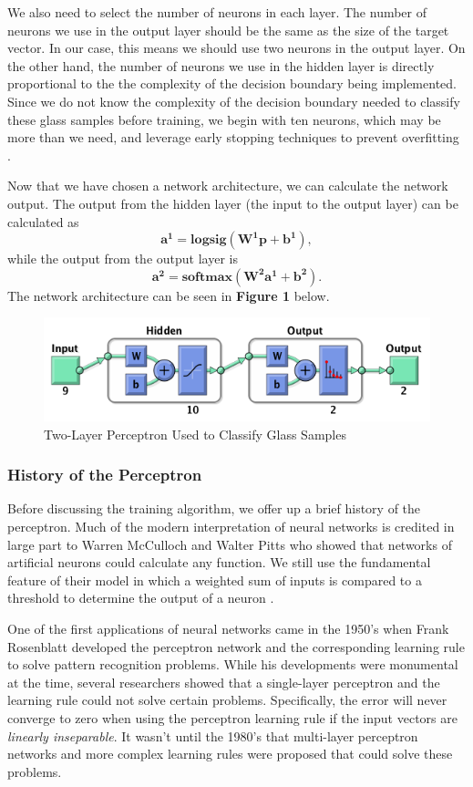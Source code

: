 \documentclass[12pt,halfline,a4paper]{ouparticle}
\begin{document}
We also need to select the number of neurons in each layer. The number of neurons we use in the output layer should be the same as the size of the target vector. In our case, this means we should use two neurons in the output layer. On the other hand, the number of neurons we use in the hidden layer is directly proportional to the the complexity of the decision boundary being implemented. Since we do not know the complexity of the decision boundary needed to classify these glass samples before training, we begin with ten neurons, which may be more than we need, and leverage early stopping techniques to prevent overfitting \cite{hagan2014}. 

Now that we have chosen a network architecture, we can calculate the network output. The output from the hidden layer (the input to the output layer) can be calculated as 
\[
\mathbf{a^{1}} = \textbf{logsig}(\mathbf{W^{1}}\mathbf{p} + \mathbf{b^{1}}), 
\] 
while the output from the output layer is 
\[ 
\mathbf{a^{2}} = \textbf{softmax}(\mathbf{W^{2}}\mathbf{a^{1}} + \mathbf{b^{2}}). 
\]
The network architecture can be seen in \textbf{Figure 1} below. 
\begin{figure}[H]
\includegraphics[width = 6in]{figs/network.png}
\caption{Two-Layer Perceptron Used to Classify Glass Samples}
\end{figure}

\subsubsection{History of the Perceptron}
\label{sec4.1.1}
Before discussing the training algorithm, we offer up a brief history of the perceptron. Much of the modern interpretation of neural networks is credited in large part to Warren McCulloch and Walter Pitts who showed that networks of artificial neurons could calculate any function. We still use the fundamental feature of their model in which a weighted sum of inputs is compared to a threshold to determine the output of a neuron \cite{hagan2014}.

One of the first applications of neural networks came in the 1950's when Frank Rosenblatt developed the perceptron network and the corresponding learning rule to solve pattern recognition problems. While his developments were monumental at the time, several researchers showed that a single-layer perceptron and the learning rule could not solve certain problems. Specifically, the error will never converge to zero when using the perceptron learning rule if the input vectors are \emph{linearly inseparable}. It wasn't until the 1980's that multi-layer perceptron networks and more complex learning rules were proposed that could solve these problems. 
\end{document}
